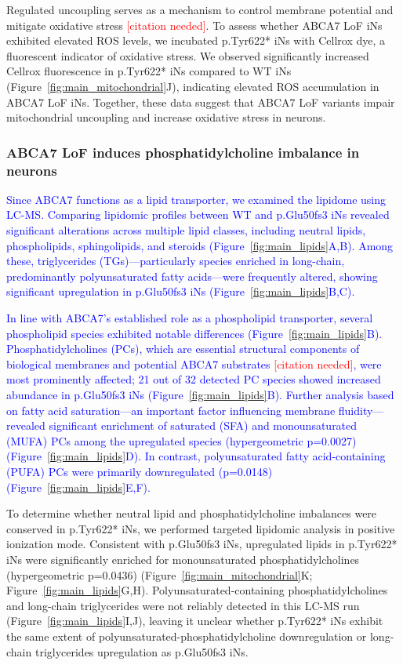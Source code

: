 Regulated uncoupling serves as a mechanism to control membrane potential and mitigate oxidative stress \textcolor{red}{[citation needed]}. To assess whether ABCA7 LoF iNs exhibited elevated ROS levels, we incubated p.Tyr622* iNs with Cellrox dye, a fluorescent indicator of oxidative stress. We observed significantly increased Cellrox fluorescence in p.Tyr622* iNs compared to WT iNs (Figure~\ref{fig:main_mitochondrial}J), indicating elevated ROS accumulation in ABCA7 LoF iNs. Together, these data suggest that ABCA7 LoF variants impair mitochondrial uncoupling and increase oxidative stress in neurons.

\subsubsection{ABCA7 LoF induces phosphatidylcholine imbalance in neurons}
\newcommand{\quoteA}{\textcolor{blue}{Since ABCA7 functions as a lipid transporter, we examined the lipidome using LC-MS. Comparing lipidomic profiles between WT and p.Glu50fs3 iNs revealed significant alterations across multiple lipid classes, including neutral lipids, phospholipids, sphingolipids, and steroids (Figure~\ref{fig:main_lipids}A,B). Among these, triglycerides (TGs)—particularly species enriched in long-chain, predominantly polyunsaturated fatty acids—were frequently altered, showing significant upregulation in p.Glu50fs3 iNs (Figure~\ref{fig:main_lipids}B,C).\label{quoteA-label}}}
\quoteA

\newcommand{\quoteB}{\textcolor{blue}{In line with ABCA7's established role as a phospholipid transporter, several phospholipid species exhibited notable differences (Figure~\ref{fig:main_lipids}B). Phosphatidylcholines (PCs), which are essential structural components of biological membranes and potential ABCA7 substrates \textcolor{red}{[citation needed]}, were most prominently affected; 21 out of 32 detected PC species showed increased abundance in p.Glu50fs3 iNs (Figure~\ref{fig:main_lipids}B). Further analysis based on fatty acid saturation—an important factor influencing membrane fluidity—revealed significant enrichment of saturated (SFA) and monounsaturated (MUFA) PCs among the upregulated species (hypergeometric p=0.0027) (Figure~\ref{fig:main_lipids}D). In contrast, polyunsaturated fatty acid-containing (PUFA) PCs were primarily downregulated (p=0.0148) (Figure~\ref{fig:main_lipids}E,F).}}
\quoteB

To determine whether neutral lipid and phosphatidylcholine imbalances were conserved in p.Tyr622* iNs, we performed targeted lipidomic analysis in positive ionization mode. Consistent with p.Glu50fs3 iNs, upregulated lipids in p.Tyr622* iNs were significantly enriched for monounsaturated phosphatidylcholines (hypergeometric p=0.0436) (Figure~\ref{fig:main_mitochondrial}K; Figure~\ref{fig:main_lipids}G,H). Polyunsaturated-containing phosphatidylcholines and long-chain triglycerides were not reliably detected in this LC-MS run (Figure~\ref{fig:main_lipids}I,J), leaving it unclear whether p.Tyr622* iNs exhibit the same extent of polyunsaturated-phosphatidylcholine downregulation or long-chain triglycerides upregulation as p.Glu50fs3 iNs.

